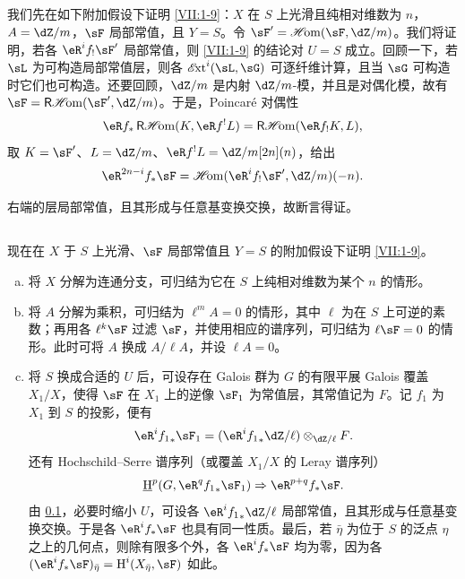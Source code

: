 \subsection{}\label{VII:2-1}

我们先在如下附加假设下证明 \ref{VII:1-9}：$X$ 在 $S$ 上光滑且纯相对维数为 $n$，$A=\dZ/m$，$\sF$ 局部常值，且 $Y=S$。令 $\sF'=\Hom(\sF,\dZ/m)$。我们将证明，若各 $\eR^i f_! \sF'$ 局部常值，则 \ref{VII:1-9} 的结论对 $U=S$ 成立。回顾一下，若 $\sL$ 为可构造局部常值层，则各 $\Ext^i(\sL,\sG)$ 可逐纤维计算，且当 $\sG$ 可构造时它们也可构造。还要回顾，$\dZ/m$ 是内射 $\dZ/m$-模，并且是对偶化模，故有 $\sF=\rHom(\sF',\dZ/m)$。于是，Poincaré 对偶性
\[
  \eR f_\ast \rHom(K,\eR f^! L) = \rHom(\eR f_! K,L) \text{,}
\]
取 $K=\sF'$、$L=\dZ/m$、$\eR f^! L = \dZ/m[2n](n)$，给出
\[
  \eR^{2n-i} f_\ast \sF = \Hom(\eR^i f_! \sF',\dZ/m)(-n) \text{.}
\]

右端的层局部常值，且其形成与任意基变换交换，故断言得证。

\subsection{}\label{VII:2-2}

现在在 $X$ 于 $S$ 上光滑、$\sF$ 局部常值且 $Y=S$ 的附加假设下证明 \ref{VII:1-9}。
\begin{enumerate}[a)]
  \item 将 $X$ 分解为连通分支，可归结为它在 $S$ 上纯相对维数为某个 $n$ 的情形。
  \item 将 $A$ 分解为乘积，可归结为 $\ell^m A=0$ 的情形，其中 $\ell$ 为在 $S$ 上可逆的素数；再用各 $\ell^k \sF$ 过滤 $\sF$，并使用相应的谱序列，可归结为 $\ell\sF=0$ 的情形。此时可将 $A$ 换成 $A/\ell A$，并设 $\ell A=0$。
  \item 将 $S$ 换成合适的 $U$ 后，可设存在 Galois 群为 $G$ 的有限平展 Galois 覆盖 $X_1/X$，使得 $\sF$ 在 $X_1$ 上的逆像 $\sF_1$ 为常值层，其常值记为 $F$。记 $f_1$ 为 $X_1$ 到 $S$ 的投影，便有
    \[
      \eR^i {f_1}_\ast \sF_1 = (\eR^i {f_1}_\ast \dZ/\ell)\otimes_{\dZ/\ell} F \text{.}
    \]
    还有 Hochschild--Serre 谱序列（或覆盖 $X_1/X$ 的 Leray 谱序列）
    \[
      \underline\h^p(G,\eR^q {f_1}_\ast \sF_1) \Rightarrow \eR^{p+q} f_\ast \sF \text{.}
    \]
    由 \ref{VII:2-1}，必要时缩小 $U$，可设各 $\eR^i {f_1}_\ast \dZ/\ell$ 局部常值，且其形成与任意基变换交换。于是各 $\eR^i f_\ast \sF$ 也具有同一性质。最后，若 $\bar\eta$ 为位于 $S$ 的泛点 $\eta$ 之上的几何点，则除有限多个外，各 $\eR^i f_\ast\sF$ 均为零，因为各 $(\eR^i f_\ast \sF)_{\bar\eta} = \h^i(X_{\bar \eta},\sF)$ 如此。
\end{enumerate}

